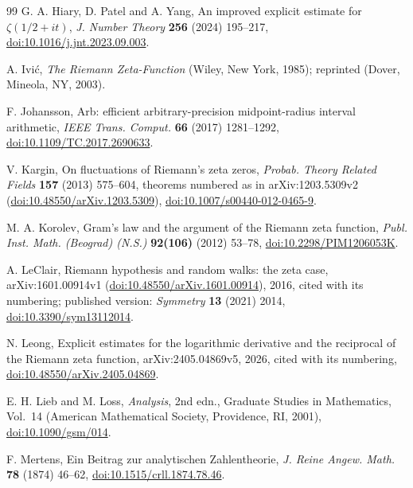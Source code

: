 \documentclass[11pt,a4paper]{article}
\numberwithin{equation}{section}
\theoremstyle{definition}
\theoremstyle{remark}
\begin{document}
\begin{thebibliography}{99}
 G. A. Hiary, D. Patel and A. Yang, An improved explicit estimate for $\zeta(1/2+it)$, \textit{J. Number Theory} \textbf{256} (2024) 195--217, \href{https://doi.org/10.1016/j.jnt.2023.09.003}{doi:10.1016/j.jnt.2023.09.003}.

 A. Ivi\'c, \textit{The Riemann Zeta-Function} (Wiley, New York, 1985); reprinted (Dover, Mineola, NY, 2003).

 F. Johansson, Arb: efficient arbitrary-precision midpoint-radius interval arithmetic, \textit{IEEE Trans. Comput.} \textbf{66} (2017) 1281--1292, \href{https://doi.org/10.1109/TC.2017.2690633}{doi:10.1109/TC.2017.2690633}.

 V. Kargin, On fluctuations of Riemann's zeta zeros, \textit{Probab. Theory Related Fields} \textbf{157} (2013) 575--604, theorems numbered as in arXiv:1203.5309v2 (\href{https://doi.org/10.48550/arXiv.1203.5309}{doi:10.48550/arXiv.1203.5309}), \href{https://doi.org/10.1007/s00440-012-0465-9}{doi:10.1007/s00440-012-0465-9}.

 M. A. Korolev, Gram's law and the argument of the Riemann zeta function, \textit{Publ. Inst. Math. (Beograd) (N.S.)} \textbf{92(106)} (2012) 53--78, \href{https://doi.org/10.2298/PIM1206053K}{doi:10.2298/PIM1206053K}.

 A. LeClair, Riemann hypothesis and random walks: the zeta case, arXiv:1601.00914v1 (\href{https://doi.org/10.48550/arXiv.1601.00914}{doi:10.48550/arXiv.1601.00914}), 2016, cited with its numbering; published version: \textit{Symmetry} \textbf{13} (2021) 2014, \href{https://doi.org/10.3390/sym13112014}{doi:10.3390/sym13112014}.

 N. Leong, Explicit estimates for the logarithmic derivative and the reciprocal of the Riemann zeta function, arXiv:2405.04869v5, 2026, cited with its numbering, \href{https://doi.org/10.48550/arXiv.2405.04869}{doi:10.48550/arXiv.2405.04869}.

 E. H. Lieb and M. Loss, \textit{Analysis}, 2nd edn., Graduate Studies in Mathematics, Vol.~14 (American Mathematical Society, Providence, RI, 2001), \href{https://doi.org/10.1090/gsm/014}{doi:10.1090/gsm/014}.

 F. Mertens, Ein Beitrag zur analytischen Zahlentheorie, \textit{J. Reine Angew. Math.} \textbf{78} (1874) 46--62, \href{https://doi.org/10.1515/crll.1874.78.46}{doi:10.1515/crll.1874.78.46}.


\end{thebibliography}
\end{document}
